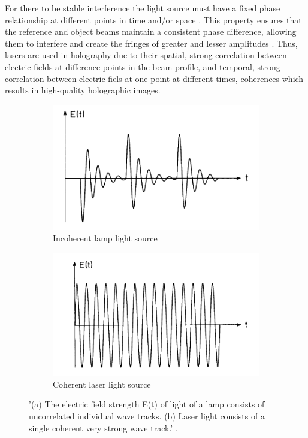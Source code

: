 \documentclass[12pt]{article}
\begin{document}
For there to be stable interference the light source must have a fixed phase relationship at different points in time and/or space \cite{wolf2007introduction}.
This property ensures that the reference and object beams maintain a consistent phase difference, allowing them to interfere and create the fringes of greater and lesser amplitudes
\cite{Born_Wolf_Bhatia_Clemmow_Gabor_Stokes_Taylor_Wayman_Wilcock_1999}.
Thus, lasers are used in holography due to their spatial, strong correlation between electric fields at difference points in the beam profile, and temporal, strong correlation between electric fiels at one point at different times, coherences
\cite{Paschotta_2007_coherence} which results in high-quality holographic images.

\begin{figure}[H]
    \centering
    \begin{subfigure}[b]{.45\textwidth}
        \centering
        \includegraphics[width=\linewidth]{incoherent source.png}
        \caption{\centering Incoherent lamp light source}
        \label{fig:5a}
    \end{subfigure}
    \hspace{-.5em}
    \begin{subfigure}[b]{.45\textwidth}
        \centering
        \includegraphics[width=\linewidth]{coherent source.png}
        \caption{\centering Coherent laser light source}
        \label{fig:5b}
    \end{subfigure}
    \caption{\centering '(a) The electric field strength E(t) of light of a lamp consists of uncorrelated individual wave tracks.
    (b) Laser light consists of a single coherent very strong wave track.' \protect\cite{haken1986laser}.}
    \label{fig:5}
\end{figure}
\end{document}
